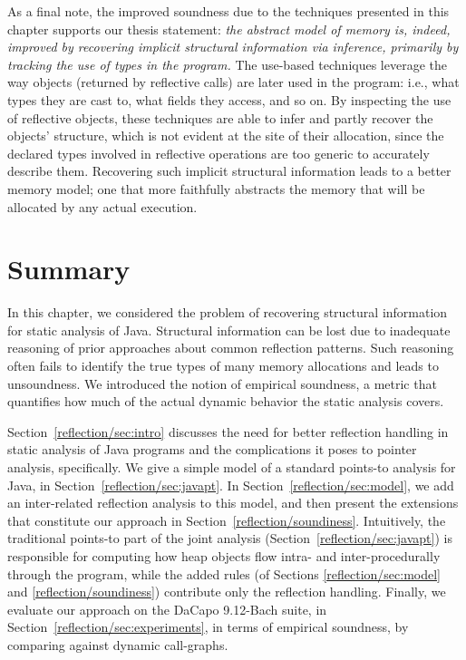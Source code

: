 
As a final note, the improved soundness due to the techniques
presented in this chapter supports our thesis statement:
%
\emph{the abstract model of memory is, indeed, improved by recovering
  implicit structural information via inference, primarily by tracking
  the use of types in the program.}
%
The use-based techniques leverage the way objects (returned by
reflective calls) are later used in the program: i.e., what types they
are cast to, what fields they access, and so on.  By inspecting the
use of reflective objects, these techniques are able to infer and
partly recover the objects' structure, which is not evident at the
site of their allocation, since the declared types involved in
reflective operations are too generic to accurately describe
them. Recovering such implicit structural information leads to a
better memory model; one that more faithfully abstracts the memory
that will be allocated by any actual execution.


\section{Summary}

In this chapter, we considered the problem of recovering structural
information for static analysis of Java. Structural information can be
lost due to inadequate reasoning of prior approaches about common
reflection patterns. Such reasoning often fails to identify the true
types of many memory allocations and leads to unsoundness. We
introduced the notion of empirical soundness, a metric that quantifies
how much of the actual dynamic behavior the static analysis covers.

Section~\ref{reflection/sec:intro} discusses the need for better
reflection handling in static analysis of Java programs and the
complications it poses to pointer analysis, specifically.
%
We give a simple model of a standard points-to analysis for Java, in
Section~\ref{reflection/sec:javapt}.
%
In Section~\ref{reflection/sec:model}, we add an inter-related
reflection analysis to this model, and then present the extensions
that constitute our approach in Section~\ref{reflection/soundiness}.
%
Intuitively, the traditional points-to part of the joint analysis
(Section~\ref{reflection/sec:javapt}) is responsible for computing how
heap objects flow intra- and inter-procedurally through the program,
while the added rules (of Sections \ref{reflection/sec:model} and
\ref{reflection/soundiness}) contribute only the reflection handling.
%
Finally, we evaluate our approach on the DaCapo 9.12-Bach suite, in
Section~\ref{reflection/sec:experiments}, in terms of empirical
soundness, by comparing against dynamic call-graphs.



